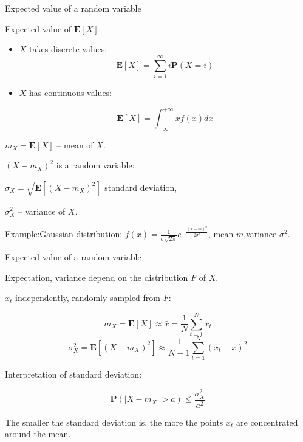 \documentclass{beamer}
\begin{document}
\begin{frame}{Expected value of a random variable}

 Expected value of $\mathbf{E}[X]$:


 \begin{itemize}
 \item $X$ takes discrete values:
    $$\mathbf{E}[X]=\sum_{i=1}^{\infty} i \mathbf{P}(X=i)$$


 \medskip

 \item $X$ has continuous values:

    \[ \mathbf{E}[X]=\int_{-\infty}^{+\infty} x f(x)dx \]
 \end{itemize}



  \begin{center}

  $m_{X}=\mathbf{E}[X]$ -- mean of $X$.

  \end{center}

  \medskip
  $(X-m_{X})^2$ is a random variable: 

  \begin{center}


      $\sigma_{X}=\sqrt{\mathbf{E}[(X-m_{X})^2]}$ standard deviation,

      $\sigma_{X}^2$ -- variance of $X$.
  
  \end{center}

  Example:Gaussian  distribution: $f(x)=\frac{1}{\sigma \sqrt{2\pi}} e^{-\frac{(x-m)^2}{2\sigma^2}}$,  
      mean $m$,variance $\sigma^2$.

\end{frame}
\begin{frame}{Expected value of a random variable}

 Expectation, variance depend on the distribution $F$ of $X$. 

 \medskip

 $x_t$ independently, randomly sampled from $F$:

    \[ m_{X}=\mathbf{E}[X]  \approx \bar{x}=\frac{1}{N} \sum_{t=1}^{N} x_t \]
      \[ \sigma_{X}^2=\mathbf{E}[(X-m_{X})^2] \approx  \frac{1}{N-1} \sum_{t=1}^{N} (x_t - \bar{x})^2 \]

  \medskip

  

  Interpretation of standard deviation:


 \[ \mathbf{P}(|X - m_{X}| > a) \le \frac{\sigma_{X}^2}{a^2} \]


   The smaller the standard deviation is, the more the points $x_t$ are concentrated around the mean.


\end{frame}
\end{document}
